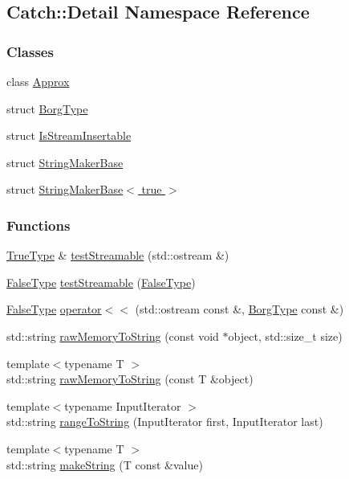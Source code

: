 \hypertarget{a00118}{}\subsection{Catch\+:\+:Detail Namespace Reference}
\label{a00118}
\subsubsection*{Classes}
\begin{DoxyCompactItemize}
\item 
class \hyperlink{a00003}{Approx}
\item 
struct \hyperlink{a00010}{Borg\+Type}
\item 
struct \hyperlink{a00043}{Is\+Stream\+Insertable}
\item 
struct \hyperlink{a00082}{String\+Maker\+Base}
\item 
struct \hyperlink{a00083}{String\+Maker\+Base$<$ true $>$}
\end{DoxyCompactItemize}
\subsubsection*{Functions}
\begin{DoxyCompactItemize}
\item 
\hyperlink{a00090}{True\+Type} \& \hyperlink{a00118_aff0ca0f561ad8053654ab27d54486197}{test\+Streamable} (std\+::ostream \&)
\item 
\hyperlink{a00029}{False\+Type} \hyperlink{a00118_aac81f01b0d687f75b8f24a925591b7ac}{test\+Streamable} (\hyperlink{a00029}{False\+Type})
\item 
\hyperlink{a00029}{False\+Type} \hyperlink{a00118_ae9a44d574c4fbd18fabaaee05a433d88}{operator$<$$<$} (std\+::ostream const \&, \hyperlink{a00010}{Borg\+Type} const \&)
\item 
std\+::string \hyperlink{a00118_ac5d6c510e565ee5bddcc2236194ce29e}{raw\+Memory\+To\+String} (const void $\ast$object, std\+::size\+\_\+t size)
\item 
{\footnotesize template$<$typename T $>$ }\\std\+::string \hyperlink{a00118_a371620ed524abfcae5c3772bf49b563a}{raw\+Memory\+To\+String} (const T \&object)
\item 
{\footnotesize template$<$typename Input\+Iterator $>$ }\\std\+::string \hyperlink{a00118_a6650a1dff325bf29962ff15ae73fd972}{range\+To\+String} (Input\+Iterator first, Input\+Iterator last)
\item 
{\footnotesize template$<$typename T $>$ }\\std\+::string \hyperlink{a00118_aef46b4178e08758524d25d1d969a503c}{make\+String} (T const \&value)
\end{DoxyCompactItemize}


